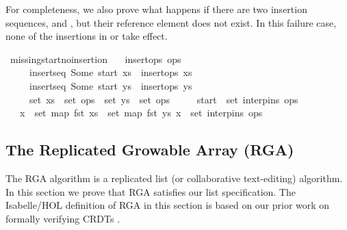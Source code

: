 \noindent
For completeness, we also prove what happens if there are two insertion sequences,  and , but their reference element  does not exist.
In this failure case, none of the insertions in  or  take effect.
\begin{isabelle}
\isamarkupfalse%
\ missing{\isacharunderscore}start{\isacharunderscore}no{\isacharunderscore}insertion{\isacharcolon}\isanewline
\ \ \ {\isachardoublequoteopen}insert{\isacharunderscore}ops\ ops{\isachardoublequoteclose}\isanewline
\ \ \ \ \ {\isachardoublequoteopen}insert{\isacharunderscore}seq\ {\isacharparenleft}Some\ start{\isacharparenright}\ xs{\isachardoublequoteclose}\ \ {\isachardoublequoteopen}insert{\isacharunderscore}ops\ xs{\isachardoublequoteclose}\isanewline
\ \ \ \ \ {\isachardoublequoteopen}insert{\isacharunderscore}seq\ {\isacharparenleft}Some\ start{\isacharparenright}\ ys{\isachardoublequoteclose}\ \ {\isachardoublequoteopen}insert{\isacharunderscore}ops\ ys{\isachardoublequoteclose}\isanewline
\ \ \ \ \ {\isachardoublequoteopen}set\ xs\ {\isasymsubseteq}\ set\ ops{\isachardoublequoteclose}\ \ {\isachardoublequoteopen}set\ ys\ {\isasymsubseteq}\ set\ ops{\isachardoublequoteclose}\isanewline
\ \ \ \ \ {\isachardoublequoteopen}start\ {\isasymnotin}\ set\ {\isacharparenleft}interp{\isacharunderscore}ins\ ops{\isacharparenright}{\isachardoublequoteclose}\isanewline
\ \ \ {\isachardoublequoteopen}{\isasymforall}x\ {\isasymin}\ set\ {\isacharparenleft}map\ fst\ xs{\isacharparenright}\ {\isasymunion}\ set\ {\isacharparenleft}map\ fst\ ys{\isacharparenright}{\isachardot}\ x\ {\isasymnotin}\ set\ {\isacharparenleft}interp{\isacharunderscore}ins\ ops{\isacharparenright}{\isachardoublequoteclose}
\end{isabelle}

\subsection{The Replicated Growable Array (RGA)}\label{appendix:rga}

The RGA algorithm \cite{Roh:2011dw} is a replicated list (or collaborative text-editing) algorithm.
In this section we prove that RGA satisfies our list specification.
The Isabelle/HOL definition of RGA in this section is based on our prior work on formally verifying CRDTs \cite{Gomes:2017gy,Gomes:2017vo}.

